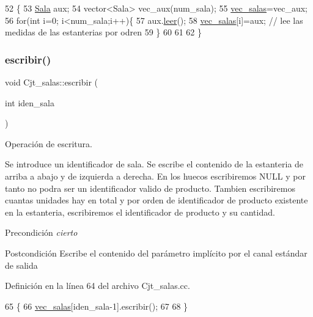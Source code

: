 \begin{DoxyCode}
52 \{
53   \hyperlink{class_sala}{Sala} aux;
54   vector<Sala> vec\_aux(num\_sala);
55   \hyperlink{class_cjt__salas_a3f130cc8bab35f449de8be69283af09e}{vec\_salas}=vec\_aux;
56   \textcolor{keywordflow}{for}(\textcolor{keywordtype}{int} i=0; i<num\_sala;i++)\{
57     aux.\hyperlink{class_sala_abbb0194559de617baeed1e4b444ed2b2}{leer}();
58     \hyperlink{class_cjt__salas_a3f130cc8bab35f449de8be69283af09e}{vec\_salas}[i]=aux; \textcolor{comment}{// lee las medidas de las estanterias por odren}
59   \}
60   
61   
62 \}
\end{DoxyCode}
\mbox{\label{class_cjt__salas_a184f3ef5d7857c7f76ecef58b093f252}} 
\subsubsection{\texorpdfstring{escribir()}{escribir()}}
{\footnotesize\ttfamily void Cjt\+\_\+salas\+::escribir (\begin{DoxyParamCaption}\item[{int}]{iden\+\_\+sala }\end{DoxyParamCaption})}



Operación de escritura. 

Se introduce un identificador de sala. Se escribe el contenido de la estanteria de arriba a abajo y de izquierda a derecha. En los huecos escribiremos N\+U\+LL y por tanto no podra ser un identificador valido de producto. Tambien escribiremos cuantas unidades hay en total y por orden de identificador de producto existente en la estanteria, escribiremos el identificador de producto y su cantidad. \begin{DoxyPrecond}{Precondición}
{\itshape cierto} 
\end{DoxyPrecond}
\begin{DoxyPostcond}{Postcondición}
Escribe el contenido del parámetro implícito por el canal estándar de salida 
\end{DoxyPostcond}


Definición en la línea 64 del archivo Cjt\+\_\+salas.\+cc.


\begin{DoxyCode}
65 \{
66   \hyperlink{class_cjt__salas_a3f130cc8bab35f449de8be69283af09e}{vec\_salas}[iden\_sala-1].escribir();
67   
68 \}
\end{DoxyCode}


